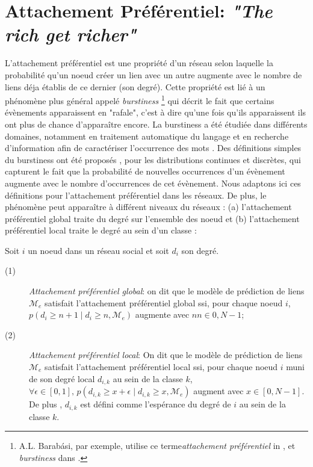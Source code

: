 \documentclass[french]{hermes-journal}
\newcommand{\pr}{p}
\begin{document}
\section{Attachement Préférentiel: \emph{"The rich get richer"}}
\label{sec:burstiness}


L'attachement préférentiel est une propriété d'un réseau selon laquelle la probabilité qu'un noeud créer un lien avec un autre augmente avec le nombre de liens déja établis de ce dernier (son degré). Cette propriété est lié à un phénomène plus général appelé \textit{burstiness} \footnote{A.L. Barab\'asi, par exemple, utilise ce terme\textit{attachement préférentiel} in \cite{barabasi1999emergence}, et \textit{burstiness} dans \cite{barabasi_burst}.} qui décrit le fait que certains évènements apparaissent en "rafale", c'est à dire qu'une fois qu'ils apparaissent ils ont plus de chance d'apparaître encore. La burstiness a été étudiée dans différents domaines, notamment en traitement automatique du langage et en recherche d'information afin de caractériser l'occurrence des mots \cite{church1995poisson}. Des définitions simples du burstiness ont été proposés \cite{clinchant2008bnb,clinchant2010information}, pour les distributions continues et discrètes, qui capturent le fait que la probabilité de nouvelles occurrences d'un évènement augmente avec le nombre d'occurrences de cet évènement. Nous adaptons ici ces définitions pour l'attachement préférentiel dans les réseaux. De plus, le phénomène peut apparaître à différent niveaux du réseaux : (a) l'attachement préférentiel global traite du degré sur l'ensemble des noeud et (b) l'attachement préférentiel local traite le degré au sein d'un classe : 


\begin{definition}
Soit $i$ un noeud dans un réseau social et soit $d_i$ son degré.
\begin{description}
    \item[(1)] \emph{Attachement préférentiel global}: on dit que le modèle de prédiction de liens $\mathcal{M}_e$ satisfait l'attachement préférentiel global ssi, pour chaque noeud $i$, $\pr(d_i \ge n+1 \mid d_i \ge n, \mathcal{M}_e)$ augmente avec $n n \in {0, N-1}$;
 \item[(2)] \emph{Attachement préférentiel local}: On dit que le modèle de prédiction de liens  $\mathcal{M}_e$ satisfait l'attachement préférentiel local ssi, pour chaque noeud $i$ muni de son degré local $d_{i,k}$  au sein de la classe $k$, $\forall \epsilon \in [0,1], \, \pr(d_{i,k} \ge x+\epsilon \mid d_{i,k} \ge x, \mathcal{M}_e)$  augment avec $x \in [0,N-1]$. De plus , $d_{i,k}$ est défini comme l'espérance du degré de $i$ au sein de la classe $k$.
\end{description}
\label{def:burst-soc-net}
\end{definition}
\end{document}
